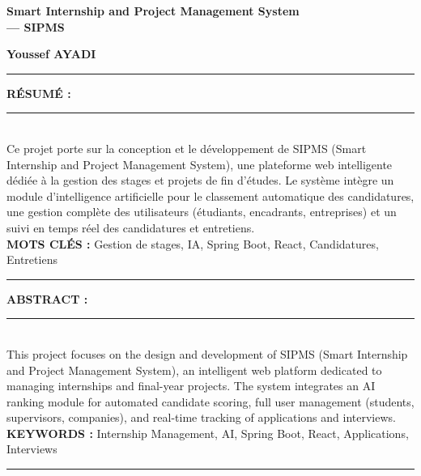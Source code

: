 \begin{titlepage}
\vspace{16pt}
\begin{center}
  {\fontsize{16pt}{20pt}\selectfont\textbf{\textcolor{titleblue}{%
    Smart Internship and Project Management System\\[4pt]--- SIPMS}}}
\end{center}

\vspace{10pt}
\begin{center}
  {\fontsize{13pt}{16pt}\selectfont\textbf{Youssef AYADI}}
\end{center}

\vspace{10pt}
\textcolor{titleblue}{\rule{\textwidth}{0.8pt}}

\vspace{18pt}
\begin{flushleft}

{\fontsize{11.5pt}{14pt}\selectfont\textbf{RÉSUMÉ :}}\\[5pt]
\textcolor{lineyellow}{\rule{\textwidth}{1.5pt}}\\[10pt]
{\fontsize{10pt}{14pt}\selectfont
Ce projet porte sur la conception et le développement de SIPMS (Smart Internship and Project
Management System), une plateforme web intelligente dédiée à la gestion des stages et projets
de fin d'études. Le système intègre un module d'intelligence artificielle pour le classement
automatique des candidatures, une gestion complète des utilisateurs (étudiants, encadrants,
entreprises) et un suivi en temps réel des candidatures et entretiens.
}\\[8pt]
{\fontsize{11pt}{13pt}\selectfont\textbf{MOTS CLÉS :}\quad}%
{\fontsize{10pt}{13pt}\selectfont Gestion de stages, IA, Spring Boot, React, Candidatures, Entretiens}\\[5pt]
\textcolor{lineyellow}{\rule{\textwidth}{1.5pt}}

\vspace{22pt}
{\fontsize{11.5pt}{14pt}\selectfont\textbf{ABSTRACT :}}\\[5pt]
\textcolor{lineyellow}{\rule{\textwidth}{1.5pt}}\\[10pt]
{\fontsize{10pt}{14pt}\selectfont
This project focuses on the design and development of SIPMS (Smart Internship and Project
Management System), an intelligent web platform dedicated to managing internships and final-year
projects. The system integrates an AI ranking module for automated candidate scoring, full
user management (students, supervisors, companies), and real-time tracking of applications
and interviews.
}\\[8pt]
{\fontsize{11pt}{13pt}\selectfont\textbf{KEYWORDS :}\quad}%
{\fontsize{10pt}{13pt}\selectfont Internship Management, AI, Spring Boot, React, Applications, Interviews}\\[5pt]
\textcolor{lineyellow}{\rule{\textwidth}{1.5pt}}


\end{flushleft}
\end{titlepage}
